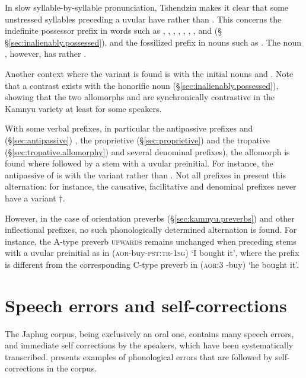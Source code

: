In slow syllable-by-syllable pronunciation, Tshendzin makes it clear that some unstressed syllables preceding a uvular have  rather than . This concerns the indefinite possessor prefix in words such as , , , , , , ,  and  (§ §\ref{sec:inalienably.possessed}), and the fossilized prefix in nouns such as . The noun , however, has  rather .

Another context where the variant  is found is with the  initial nouns  and . Note that a contrast exists with the honorific noun  (§\ref{sec:inalienably.possessed}), showing that the two allomorphs  and  are synchronically contrastive in the Kamnyu variety at least for some speakers.

With some verbal prefixes, in particular the antipassive prefixes  and  (§\ref{sec:antipassive}) , the proprietive  (§\ref{sec:proprietive}) and the tropative  (§\ref{sec:tropative.allomorphy}) and several denominal prefixes), the  allomorph is found where followed by a stem with a uvular preinitial. For instance, the antipassive of  is  with the variant  rather than . Not all prefixes in  present this alternation: for instance, the causative, facilitative and denominal prefixes  never have a variant $\dagger$.

However, in the case of orientation preverbs (§\ref{sec:kamnyu.preverbs}) and other inflectional prefixes, no such phonologically determined alternation is found. For instance, the A-type preverb  \textsc{upwards} remains unchanged when preceding stems with a uvular preinitial as in  (\textsc{aor}-buy-\textsc{pst}:\textsc{tr}-\textsc{1sg}) `I bought it', where the prefix  is different from the corresponding C-type preverb  in  (\textsc{aor}:3 \flobv{}-buy) `he bought it'.

\section{Speech errors and self-corrections} \label{sec:self.corrections}
The Japhug corpus, being exclusively an oral one, contains many speech errors, and immediate self corrections by the speakers, which have been systematically transcribed.  presents examples of phonological errors that are followed by self-corrections in the corpus.

